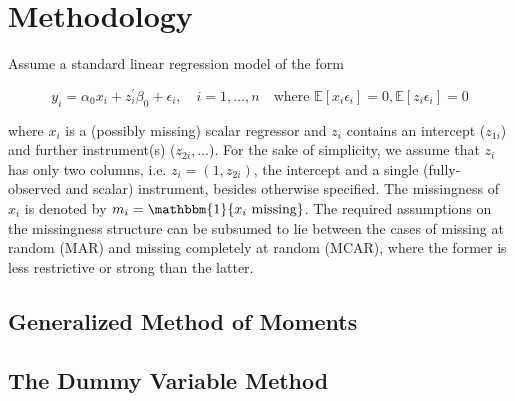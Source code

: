 \section{Methodology}
Assume a standard linear regression model of the form

\begin{equation}\label{eq:1}
    y_i = \alpha_0 x_i + z_i^{\prime} \beta_0 + \epsilon_i, \quad i= 1,\ldots,n \quad \text{where }  \mathbb{E}[x_i \epsilon_i] = 0, \mathbb{E}[z_i \epsilon_i] = 0
\end{equation}

where $x_i$ is a (possibly missing) scalar regressor and $z_i$ contains an intercept ($z_{1i}$) and further instrument(s) ($z_{2i}, \ldots$).
For the sake of simplicity, we assume that $z_i$ has only two columns, i.e. $z_i = (1, z_{2i})$, the intercept and a single (fully-observed and scalar) instrument, besides otherwise specified.
The missingness of $x_i$ is denoted by $m_i = \mathbbm{1}\{x_i \text{ missing}\}$.
The required assumptions on the missingness structure can be subsumed to lie between the cases of missing at random (MAR) and missing completely at random (MCAR), where the former is less restrictive or strong than the latter.

\subsection{Generalized Method of Moments}

\subsection{The Dummy Variable Method}
